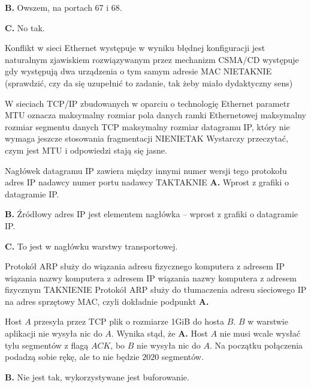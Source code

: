 \begin{solutions}
    \textbf{B.} Owszem, na portach 67 i 68.

    \textbf{C.} No tak.

    \sol Konflikt w sieci Ethernet
    \answerss
    {występuje w wyniku błędnej konfiguracji}
    {jest naturalnym zjawiskiem rozwiązywanym przez mechanizm CSMA/CD}
    {występuje gdy występują dwa urządzenia o tym samym adresie MAC}
    {NIE}{TAK}{NIE}
    (sprawdzić, czy da się uzupełnić to zadanie, tak żeby miało dydaktyczny sens)

    \sol W sieciach TCP/IP zbudowanych w oparciu o technologię Ethernet parametr MTU oznacza
    \answerss
    {maksymalny rozmiar pola danych ramki Ethernetowej}
    {maksymalny rozmiar segmentu danych TCP}
    {maksymalny rozmiar datagramu IP, który nie wymaga jeszcze stosowania fragmentacji}
    {NIE}{NIE}{TAK}
    Wystarczy przeczytać, czym jest MTU i odpowiedzi stają się jasne.

    \sol Nagłówek datagramu IP zawiera między innymi
    \answerss
    {numer wersji tego protokołu}
    {adres IP nadawcy}
    {numer portu nadawcy}
    {TAK}{TAK}{NIE}
    \textbf{A.} Wprost z grafiki o datagramie IP.
    
    \textbf{B.} Źródłowy adres IP jest elementem nagłówka -- wprost z grafiki o datagramie IP.
    
    \textbf{C.} To jest w nagłówku warstwy transportowej.

    \sol Protokół ARP służy do
    \answerss
    {wiązania adresu fizycznego komputera z adresem IP}
    {wiązania nazwy komputera z adresem IP}
    {wiązania nazwy komputera z adresem fizycznym}
    {TAK}{NIE}{NIE}
    Protokół ARP służy do tłumaczenia adresu sieciowego IP na adres sprzętowy MAC, czyli dokładnie podpunkt \textbf{A.}

    \sol Host $A$ przesyła przez TCP plik o rozmiarze 1GiB do hosta $B$. $B$ w warstwie aplikacji nie wysyła nic do $A$. Wynika stąd, że
    \textbf{A.} Host $A$ nie musi wcale wysłać tylu segmentów z flagą $ACK$, bo $B$ nie wysyła nic do $A$. Na początku połączenia podadzą sobie rękę, ale to nie będzie $2020$ segmentów.
    
    \textbf{B.} Nie jest tak, wykorzystywane jest buforowanie.
    

\end{solutions}
